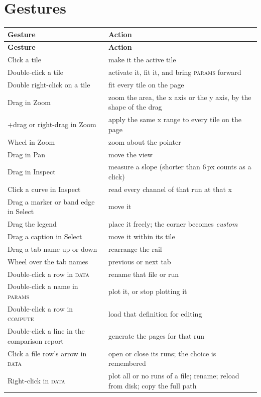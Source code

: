 \documentclass[11pt,a4paper,oneside]{report}
\newcommand{\key}[1]{\textsf{\small\fbox{#1}}}
\newcommand{\tab}[1]{\textsc{#1}}
\begin{document}
\section{Gestures}

\begin{center}
\small
\begin{longtable}{@{}p{}p{}@{}}
\toprule
\textbf{Gesture} & \textbf{Action} \\
\midrule
\endfirsthead
\toprule
\textbf{Gesture} & \textbf{Action} \\
\midrule
\endhead
Click a tile & make it the active tile \\
Double-click a tile & activate it, fit it, and bring \tab{params} forward \\
Double right-click on a tile & fit every tile on the page \\
Drag in Zoom & zoom the area, the x axis or the y axis, by the shape of the drag \\
\key{Ctrl}+drag or right-drag in Zoom & apply the same x range to every tile on the page \\
Wheel in Zoom & zoom about the pointer \\
Drag in Pan & move the view \\
Drag in Inspect & measure a slope (shorter than 6\,px counts as a click) \\
Click a curve in Inspect & read every channel of that run at that x \\
Drag a marker or band edge in Select & move it \\
Drag the legend & place it freely; the corner becomes \emph{custom} \\
Drag a caption in Select & move it within its tile \\
Drag a tab name up or down & rearrange the rail \\
Wheel over the tab names & previous or next tab \\
Double-click a row in \tab{data} & rename that file or run \\
Double-click a name in \tab{params} & plot it, or stop plotting it \\
Double-click a row in \tab{compute} & load that definition for editing \\
Double-click a line in the comparison report & generate the pages for that run \\
Click a file row's arrow in \tab{data} & open or close its runs; the choice is remembered \\
Right-click in \tab{data} & plot all or no runs of a file; rename; reload from disk; copy the full path \\

\end{longtable}
\end{center}
\end{document}
